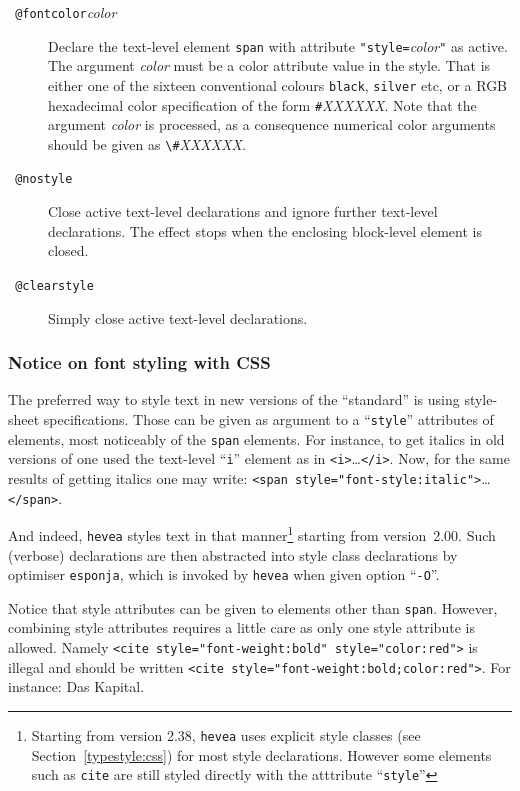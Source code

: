 \begin{description}
\item[{\tt{} @fontcolor}{\it color}{\tt{}}]
Declare the text-level element \verb+span+ with attribute
\verb+"style=+\textit{color}\verb+"+ as active.
The argument \textit{color} must be a color attribute value in the \html{}
style. That is either one of the sixteen conventional colours
\verb+black+, \verb+silver+ etc, or a RGB hexadecimal color specification
of the form
\verb+#+\textit{XXXXXX}.
Note that the argument \textit{color} is processed, as a consequence
numerical color arguments should be given as \verb+\#+\textit{XXXXXX}.



\item[{\tt{} @nostyle}]
Close active text-level declarations and ignore further text-level
declarations.
The effect stops when the enclosing block-level element is closed.
\item[{\tt{} @clearstyle}]
Simply close active text-level declarations.
\end{description}

\subsubsection*{Notice on font styling with CSS}

The preferred way to style text in new versions of the \html{} ``standard''
is using style-sheet specifications. Those can be given as argument to
a ``\texttt{style}'' attributes of \html{} elements, most noticeably
of the \texttt{span} elements.
For instance, to get italics in old versions of \html{} one used
the text-level ``\texttt{i}'' element as in
\verb+<i>+\ldots\verb+</i>+. Now, for the same results of getting
 italics one may write:
\verb+<span style="font-style:italic">+\ldots\verb+</span>+.

And indeed, \texttt{hevea} styles text in that manner\footnote{Starting from version 2.38, \texttt{hevea}
uses explicit style classes (see Section~\ref{typestyle:css})
for most style declarations. However some elements such as \texttt{cite}
are still styled directly with the atttribute ``\texttt{style}''}
starting from version~2.00.
Such (verbose) declarations are then abstracted into style class declarations
by \hevea{} optimiser \texttt{esponja}, which is invoked by \texttt{hevea}
when given option ``\texttt{-O}''.

Notice that style attributes can be given to elements other than \texttt{span}.
However, combining style attributes requires a little care as only one style
attribute is allowed.
Namely \verb+<cite style="font-weight:bold" style="color:red">+
is illegal and should be written 
\verb+<cite style="font-weight:bold;color:red">+.
\ifhevea
For instance:
{Das Kapital}.
\fi

